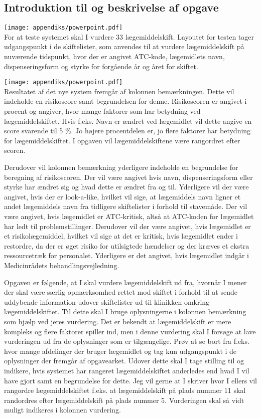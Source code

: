 \subsection{Introduktion til og beskrivelse af opgave}
\vspace{-0.3cm}
\texttt{[image: appendiks/powerpoint.pdf]} \\
For at teste systemet skal I vurdere 33 lægemiddelskift. Layoutet for testen tager udgangspunkt i de skiftelister, som anvendes til at vurdere lægemiddelskift på nuværende tidspunkt, hvor der er angivet ATC-kode, lægemidlets navn, dispenseringsform og styrke for forgående år og året for skiftet.


\texttt{[image: appendiks/powerpoint.pdf]} \\
Resultatet af det nye system fremgår af kolonnen bemærkningen. Dette vil indeholde en risikoscore samt begrundelsen for denne. Risikoscoren er angivet i procent og angiver, hvor mange faktorer som har betydning ved lægemiddelskiftet. Hvis f.eks. Navn er ændret ved lægemidlet vil dette angive en score svarende til 5 \%. Jo højere procentdelen er, jo flere faktorer har betydning for lægemiddelskiftet. I opgaven vil lægemiddelskiftene være rangordret efter scoren.  

Derudover vil kolonnen bemærkning yderligere indeholde en begrundelse for beregning af risikoscoren. Der vil være angivet hvis navn, dispenseringsform eller styrke har ændret sig og hvad dette er ændret fra og til. Yderligere vil der være angivet, hvis der er look-a-like, hvilket vil sige, at lægemiddels navn ligner et andet lægemiddels navn fra tidligere skiftelister i forhold til stavemåde. Der vil være angivet, hvis lægemidlet er ATC-kritisk, altså at ATC-koden for lægemidlet har ledt til problemstillinger. Derudover vil der være angivet, hvis lægemidlet er et risikolægemiddel, hvilket vil sige at det er kritisk, hvis lægemidlet ender i restordre, da der er øget risiko for utilsigtede hændelser og der kræves et ekstra ressourcetræk for personalet. Yderligere er det angivet, hvis lægemidlet indgår i Medicinrådets behandlingsvejledning. 

Opgaven er følgende, at I skal vurdere lægemiddelskift ud fra, hvornår I mener der skal være særlig opmærksomhed rettet mod skiftet i forhold til at sende uddybende information udover skiftelister ud til klinikken omkring lægemiddelskiftet. Til dette skal I bruge oplysningerne i kolonnen bemærkning som hjælp ved jeres vurdering. Det er bekendt at lægemiddelskift er mere kompleks og flere faktorer spiller ind, men i denne vurdering skal I forsøge at lave vurderingen ud fra de oplysninger som er tilgængelige. Prøv at se bort fra f.eks. hvor mange afdelinger der bruger lægemidlet og tag kun udgangspunkt i de oplysninger der fremgår af opgavearket. Udover dette skal I tage stilling til og indikere, hvis systemet har rangeret lægemiddelskiftet anderledes end hvad I vil have gjort samt en begrundelse for dette. Jeg vil gerne at I skriver hvor I ellers vil rangordre lægemiddelskiftet f.eks. at lægemiddelskift på plads nummer 11 skal randordres efter lægemiddelskift på plads nummer 5. Vurderingen skal så vidt muligt indikeres i kolonnen vurdering.

